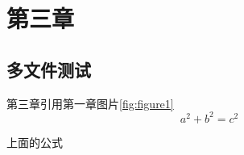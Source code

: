 \documentclass[../../main.tex]{subfiles}
\begin{document}
\chapter{第三章}
\section{多文件测试}
第三章引用第一章图片\ref{fig:figure1}
\begin{equation}
	a^2+b^2=c^2
\end{equation}

上面的公式
\end{document}
